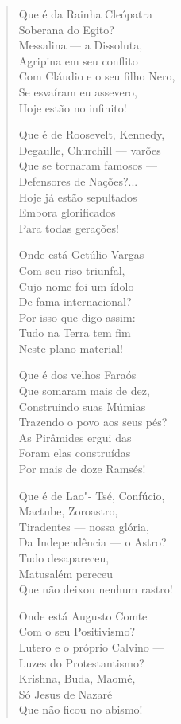 \begin{verse}
Que é da Rainha Cleópatra \\
Soberana do Egito? \\
Messalina ---  a Dissoluta, \\
Agripina em seu conflito \\
Com Cláudio e o seu filho Nero, \\
Se esvaíram eu assevero, \\
Hoje estão no infinito! 
\pagebreak

Que é de Roosevelt, Kennedy, \\
Degaulle, Churchill ---  varões \\
Que se tornaram famosos --- \\
Defensores de Nações?... \\
Hoje já estão sepultados \\
Embora glorificados \\
Para todas gerações! 

Onde está Getúlio Vargas \\
Com seu riso triunfal, \\
Cujo nome foi um ídolo \\
De fama internacional? \\
Por isso que digo assim: \\
Tudo na Terra tem fim \\
Neste plano material! 

Que é dos velhos Faraós \\
Que somaram mais de dez, \\
Construindo suas Múmias \\
Trazendo o povo aos seus pés? \\
As Pirâmides ergui das \\
Foram elas construídas \\
Por mais de doze Ramsés! 

Que é de Lao"- Tsé, Confúcio, \\
Mactube, Zoroastro, \\
Tiradentes ---  nossa glória, \\
Da Independência ---  o Astro? \\
Tudo desapareceu, \\
Matusalém pereceu \\
Que não deixou nenhum rastro! 
\pagebreak

Onde está Augusto Comte \\
Com o seu Positivismo? \\
Lutero e o próprio Calvino  ---\\
Luzes do Protestantismo? \\
Krishna, Buda, Maomé, \\
Só Jesus de Nazaré \\
Que não ficou no abismo! 


\end{verse}
